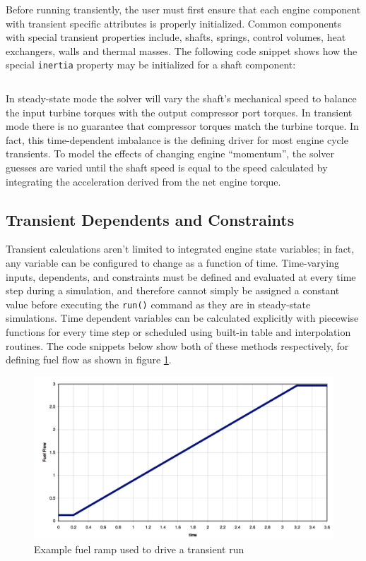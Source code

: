 \documentclass[heading.tex]{subfiles}
\begin{document}
Before running transiently, the user must first ensure that each engine component with transient
specific attributes is properly initialized. Common components with special transient properties
include, shafts, springs, control volumes, heat exchangers, walls and thermal masses.
The following code snippet shows how the special \texttt{inertia} property may be initialized
for a shaft component:

 \begin{adjustwidth}{-1cm}{-1cm}
 \inputminted[]{c++}{code/shaft.mdl}
 \end{adjustwidth} 

In steady-state mode the solver will vary the shaft's mechanical speed to
balance the input turbine torques with the output compressor port torques.
In transient mode there is no guarantee that compressor torques match the
turbine torque. In fact, this time-dependent imbalance is the defining driver
for most engine cycle transients.
To model the effects of changing engine ``momentum'',
the solver guesses are varied until the shaft speed 
is equal to the speed calculated by integrating
the acceleration derived from the net engine torque.

\subsection{Transient Dependents and Constraints}

Transient calculations aren't limited to integrated engine state variables;
in fact, any variable can be configured to change as a function of time.
Time-varying inputs, dependents, and constraints must be defined and evaluated at every time
step during a simulation, and therefore cannot simply be
assigned a constant value before executing the \texttt{run()} command as they are in steady-state simulations.
Time dependent variables can be calculated explicitly with
piecewise functions for every time step or scheduled using built-in table and interpolation routines.
The code snippets below show both of these methods respectively, for defining fuel flow as shown in figure \ref{f:ramp}.

\begin{figure}[H]
\centering
\includegraphics[width=1.0\textwidth]{images/fuelRamp}
\caption{Example fuel ramp used to drive a transient run}
\label{f:ramp}
\end{figure}
\end{document}
